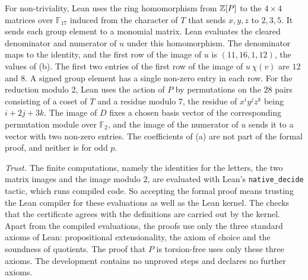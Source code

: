 \documentclass[11pt,colorlinks]{charlie}
\newcommand{\F}{\mathbb{F}}
\begin{document}
For non-triviality, Lean uses the ring homomorphism from $\mathbb{Z}[P]$ to the $4\times4$ matrices over $\F_{17}$ induced from the character of $T$ that sends $x,y,z$ to $2,3,5$. It sends each group element to a monomial matrix. Lean evaluates the cleared denominator and numerator of $u$ under this homomorphism. The denominator maps to the identity, and the first row of the image of $u$ is $(11,16,1,12)$, the values of (b). The first two entries of the first row of the image of $u\,\chi(v)$ are $12$ and $8$. A signed group element has a single non-zero entry in each row. For the reduction modulo $2$, Lean uses the action of $P$ by permutations on the $28$ pairs consisting of a coset of $T$ and a residue modulo $7$, the residue of $x^iy^jz^k$ being $i+2j+3k$. The image of $D$ fixes a chosen basis vector of the corresponding permutation module over $\F_2$, and the image of the numerator of $u$ sends it to a vector with two non-zero entries. The coefficients of (a) are not part of the formal proof, and neither is  for odd $p$.

\emph{Trust.} The finite computations, namely the identities for the letters, the two matrix images and the image modulo $2$, are evaluated with Lean's \texttt{native\_decide} tactic, which runs compiled code. So accepting the formal proof means trusting the Lean compiler for these evaluations as well as the Lean kernel. The checks that the certificate agrees with the definitions are carried out by the kernel. Apart from the compiled evaluations, the proofs use only the three standard axioms of Lean: propositional extensionality, the axiom of choice and the soundness of quotients. The proof that $P$ is torsion-free uses only these three axioms. The development contains no unproved steps and declares no further axioms.
\end{document}

